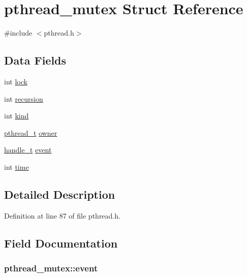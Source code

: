 \hypertarget{structpthread__mutex}{\section{pthread\+\_\+mutex Struct Reference}
\label{structpthread__mutex}
}


{\ttfamily \#include $<$pthread.\+h$>$}

\subsection*{Data Fields}
\begin{DoxyCompactItemize}
\item 
int \hyperlink{structpthread__mutex_a039843af2bfee5ac32a1c4452108b833}{lock}
\item 
int \hyperlink{structpthread__mutex_ad0a6948ac1d12f9ec3f11fea2ac07ff9}{recursion}
\item 
int \hyperlink{structpthread__mutex_a0a817c827021f648ceba78fb34b61f62}{kind}
\item 
\hyperlink{pthread_8h_a6766c2345d5c6fe6407d9f6b844e584a}{pthread\+\_\+t} \hyperlink{structpthread__mutex_a3d3ee80fcc9a148717677554d05d9d4a}{owner}
\item 
\hyperlink{pthread_8h_aea4188cfb1472f9bb606fd2566133e34}{handle\+\_\+t} \hyperlink{structpthread__mutex_a3fdfabe67e940844d49b5f98809907f3}{event}
\item 
int \hyperlink{structpthread__mutex_abd1e1875e0231a5dd6146adb8d6380c0}{time}
\end{DoxyCompactItemize}


\subsection{Detailed Description}


Definition at line 87 of file pthread.\+h.



\subsection{Field Documentation}
\hypertarget{structpthread__mutex_a3fdfabe67e940844d49b5f98809907f3}{
\subsubsection[{event}]{ pthread\+\_\+mutex\+::event}}\label{structpthread__mutex_a3fdfabe67e940844d49b5f98809907f3}


